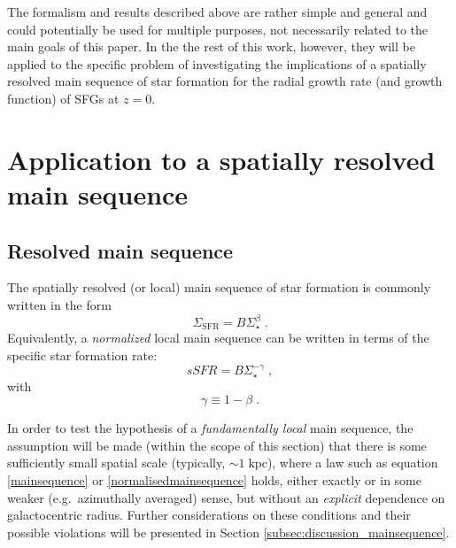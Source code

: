 \documentclass[fleqn,usenatbib]{mnras}
\begin{document}
The formalism and results described above are rather simple and general and could potentially be used for multiple purposes, not necessarily related to the main goals of this paper. In the the rest of this work, however, they will be applied to the specific problem of investigating the implications of a spatially resolved main sequence of star formation for the radial growth rate (and growth function) of SFGs at $z=0$.



\section[Application to a local main sequence]{Application to a spatially resolved main sequence}\label{sec:MainSequence}

\subsection{Resolved main sequence}

The spatially resolved (or local) main sequence of star formation is commonly written in the form
\begin{equation}\label{mainsequence}
\Sigma_\textrm{SFR} = B \Sigma_\star^\beta \; .
\end{equation}
Equivalently, a \emph{normalized} local main sequence can be written in terms of the specific star formation rate:
\begin{equation}\label{normalisedmainsequence}
sSFR = B \Sigma_\star^{-\gamma} \; ,
\end{equation}
with
\begin{equation}\label{gammadef}
\gamma \equiv 1- \beta \; .
\end{equation}

In order to test the hypothesis of a \emph{fundamentally local} main sequence, the assumption will be made (within the scope of this section) that there is some sufficiently small spatial scale (typically, $\sim 1 \; \textrm{kpc}$), where a law such as equation \eqref{mainsequence} or \eqref{normalisedmainsequence} holds, either exactly or in some weaker (e.g.\ azimuthally averaged) sense, but without an \emph{explicit} dependence on galactocentric radius. Further considerations on these conditions and their possible violations will be presented in Section \ref{subsec:discussion_mainsequence}.
\end{document}
